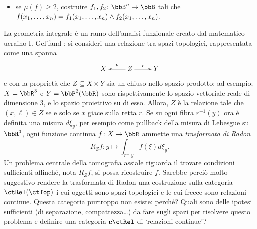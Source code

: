\begin{esercizi}
\begin{itemize}
  \item se \(\mu(f)\ge 2\), costruire \(f_1,f_2\colon\bbB^n\to \bbB\) tali che \(f(\tup xn,) = f_1(\tup xn,) \land f_2(\tup xn,)\).
 \end{itemize}
 \item La geometria integrale è un ramo dell'analisi funzionale creato dal matematico ucraino I. Gel'fand \cite{Gelfand1960IntegralGeometry,GelfandGraev1959}; si consideri una relazione tra spazi topologici, rappresentata come una spanna
 \[\xymatrix{
   X & Z \ar[r]^-r \ar[l]_-p & Y
  }\]
 e con la proprietà che \(Z\subseteq X\times Y\) sia un chiuso nello spazio prodotto; ad esempio; \(X=\bbR^3\) e \(Y=\bbP^2(\bbR)\) sono rispettivamente lo spazio vettoriale reale di dimensione 3, e lo spazio proiettivo su di esso. Allora, \(Z\) è la relazione tale che \((x,\ell)\in Z\) se e solo se \(x\) giace sulla retta \(r\). Se su ogni fibra \(r^{-1}(y)\) ora è definita una misura \(d\xi_y\), per esempio come pullback della misura di Lebesgue su \(\bbR^3\), ogni funzione continua \(f \colon X\to\bbR\) ammette una \emph{trasformata di Radon}
 \[R_Zf : y\mapsto \int_{r^{-1}y} f(\xi)d\xi_y.\]
 Un problema centrale della tomografia assiale riguarda il trovare condizioni sufficienti affinché, nota \(R_Zf\), si possa ricostruire \(f\). Sarebbe perciò molto suggestivo rendere la trasformata di Radon una costruzione sulla categoria \(\ctRel(\ctTop)\) i cui oggetti sono spazi topologici e le cui frecce sono relazioni continue. Questa categoria purtroppo non esiste: perché? Quali sono delle ipotesi sufficienti (di separazione, compattezza\dots) da fare sugli spazi per risolvere questo problema e definire una categoria \(\cate{c}\ctRel\) di `relazioni continue'?
\end{esercizi}
